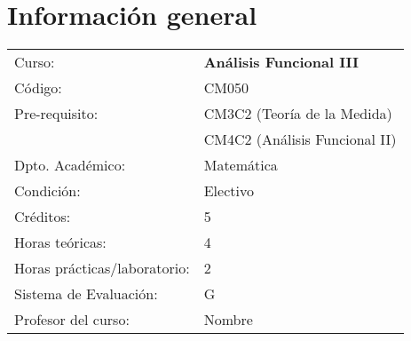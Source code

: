\section{Información general}

\providecommand{\name}{Nombre}
\begin{table}[ht!]
    \begin{tabular}{ll}
        Curso:
         & \textbf{Análisis Funcional III} \\
        Código:
         & CM050                           \\
        Pre-requisito:
         & CM3C2 (Teoría de la Medida)     \\
         & CM4C2 (Análisis Funcional II)   \\
        Dpto. Académico:
         & Matemática                      \\
        Condición:
         & Electivo                        \\
        Créditos:
         & 5                               \\
        Horas teóricas:
         & 4                               \\
        Horas prácticas/laboratorio:
         & 2                               \\
        Sistema de Evaluación:
         & G                               \\
        Profesor del curso:
         & \name
    \end{tabular}
\end{table}